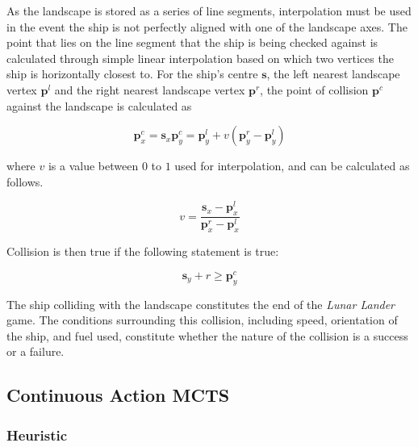 \documentclass[conference]{IEEEtran}
\begin{document}
As the landscape is stored as a series of line segments, interpolation must be used in the event the ship is not perfectly aligned with one of the landscape axes. The point that lies on the line segment that the ship is being checked against is calculated through simple linear interpolation based on which two vertices the ship is horizontally closest to. For the ship's centre $\boldsymbol {s}$, the left nearest landscape vertex $\boldsymbol {p}^{l}$ and the right nearest landscape vertex $\boldsymbol {p}^{r}$, the point of collision $\boldsymbol {p}^{c}$ against the landscape is calculated as 


\begin{equation}
\boldsymbol {p}_{x}^{c} = \boldsymbol {s}_{x}
\boldsymbol {p}_{y}^{c} = \boldsymbol {p}_{y}^{l} + v(\boldsymbol {p}_{y}^{r} - \boldsymbol {p}_{y}^{l})
\end{equation}

where $v$ is a value between $0$ to $1$ used for interpolation, and can be calculated as follows.

\begin{equation}
v = \frac{ {\boldsymbol {s}_{x} - \boldsymbol {p}_{x}^{l}}}{ {\boldsymbol {p}_{x}^{r} - \boldsymbol {p}_{x}^{l}} }
\end{equation}

Collision is then true if the following statement is true:

\begin{equation}
\boldsymbol {s}_{y} + r \geq \boldsymbol {p}^{c}_{y}
\end{equation}

The ship colliding with the landscape constitutes the end of the {\itshape Lunar Lander} game. The conditions surrounding this collision, including speed, orientation of the ship, and fuel used, constitute whether the nature of the collision is a success or a failure.


\subsection{Continuous Action MCTS} %

\subsubsection{Heuristic} %

\end{document}
